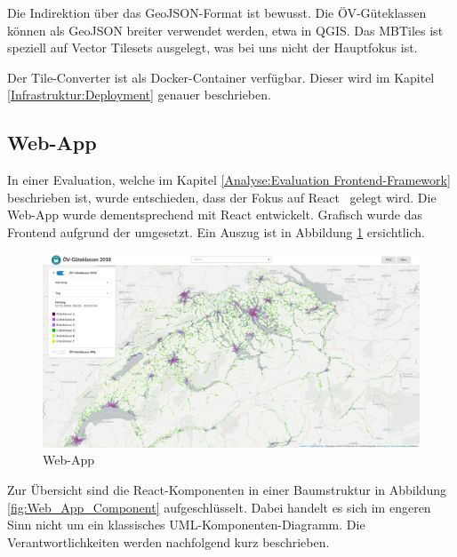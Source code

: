 Die Indirektion über das \gls{GeoJSON}-Format ist bewusst.
Die ÖV-Güteklassen können als \gls{GeoJSON} breiter verwendet werden, etwa in \gls{QGIS}.
Das MBTiles ist speziell auf Vector Tilesets ausgelegt, was bei uns nicht der Hauptfokus ist.

Der Tile-Converter ist als Docker-Container verfügbar.
Dieser wird im Kapitel \ref{Infrastruktur:Deployment} genauer beschrieben.

\subsection{Web-App}
\label{Implementation:Web-App}

In einer Evaluation, welche im Kapitel \ref{Analyse:Evaluation Frontend-Framework} beschrieben ist, wurde entschieden, dass der Fokus auf React~\cite{react} gelegt wird.
Die Web-App wurde dementsprechend mit React entwickelt.
Grafisch wurde das Frontend aufgrund der  umgesetzt.
Ein Auszug ist in Abbildung \ref{fig:Web_App} ersichtlich.

\begin{figure}[ht]
    \centering
    \includegraphics[width=1.0\linewidth]{projectdoc/img/screenshot-webapp.png}
    \caption[Web-App]{Web-App}
    \label{fig:Web_App}
\end{figure}

Zur Übersicht sind die React-Komponenten in einer Baumstruktur in Abbildung \ref{fig:Web_App_Component} aufgeschlüsselt.
Dabei handelt es sich im engeren Sinn nicht um ein klassisches UML-Komponenten-Diagramm.
Die Verantwortlichkeiten werden nachfolgend kurz beschrieben.

